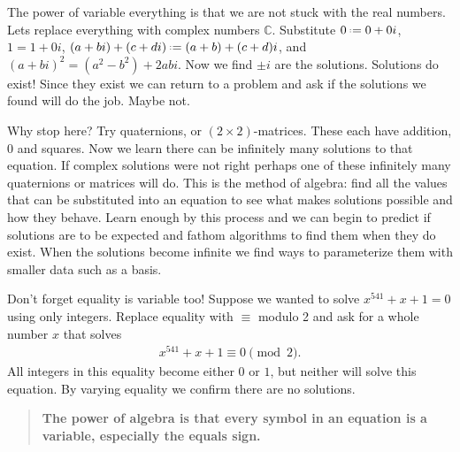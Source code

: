 The power of variable everything is that we are not stuck with the real numbers.
Lets replace everything with complex numbers $\mathbb{C}$. Substitute $0\defeq
0+0i$, $1=1+0i$, $(a+bi)+(c+di)\defeq (a+b)+(c+d)i$, and
$(a+bi)^2=(a^2-b^2)+2abi$.  Now we find $\pm i$ are the solutions. Solutions do
exist!  Since they exist we can return to a problem and ask if the solutions we 
found will do the job.  Maybe not.  

Why stop here? Try quaternions, or $(2\times 2)$-matrices.  These each have
addition, 0 and squares.  Now we learn there can be infinitely many solutions to
that equation.  If complex solutions were not right perhaps one of these
infinitely many quaternions or matrices will do.  This is the method of algebra:
find all the values that can be substituted into an equation to see what makes
solutions possible and how they behave.  Learn enough by this process and we can
begin to predict if solutions are to be expected and fathom algorithms to find
them when they do exist. When the solutions become infinite we find ways to
parameterize them with smaller data such as a basis.

Don't forget equality is variable too!  Suppose we wanted to solve $x^{541}+x+1=0$
using only integers.  Replace equality 
with $\equiv$ modulo 2 and ask for a whole number $x$ that solves
\begin{align*}
    x^{541}+x+1\equiv 0\pmod{2}.
\end{align*}
All integers in this equality become either $0$ or $1$, but neither will solve 
this equation.  By varying equality we confirm there are no solutions.


\begin{quote}
    \textbf{The power of algebra is that every symbol 
    in an equation is a variable, especially the equals sign.}
\end{quote}
